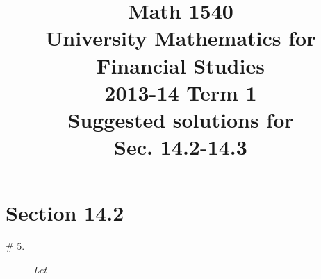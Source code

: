 \documentclass[8pt]{article} %
\title{Math 1540\\University Mathematics for Financial Studies\\2013-14 Term 1\\Suggested solutions for\\
Sec. 14.2-14.3}
\begin{document}
\maketitle
\section{Section 14.2}
\begin{description}
	\item[\# 5.]{{\it Let}
		}
\end{description}
\end{document}
